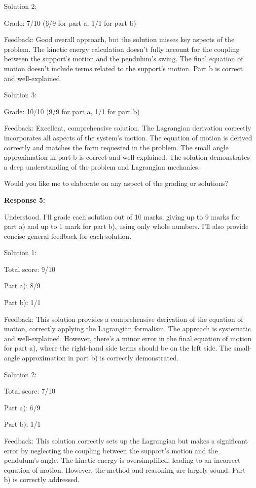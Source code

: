 \documentclass[a4paper,11pt]{article}
\begin{document}
Solution 2:

Grade: 7/10 (6/9 for part a, 1/1 for part b)

Feedback: Good overall approach, but the solution misses key aspects of the problem. The kinetic energy calculation doesn't fully account for the coupling between the support's motion and the pendulum's swing. The final equation of motion doesn't include terms related to the support's motion. Part b is correct and well-explained.

Solution 3:

Grade: 10/10 (9/9 for part a, 1/1 for part b)

Feedback: Excellent, comprehensive solution. The Lagrangian derivation correctly incorporates all aspects of the system's motion. The equation of motion is derived correctly and matches the form requested in the problem. The small angle approximation in part b is correct and well-explained. The solution demonstrates a deep understanding of the problem and Lagrangian mechanics.

Would you like me to elaborate on any aspect of the grading or solutions?

\bigskip
\textbf{Response 5:}

Understood. I'll grade each solution out of 10 marks, giving up to 9 marks for part a) and up to 1 mark for part b), using only whole numbers. I'll also provide concise general feedback for each solution.

Solution 1:

Total score: 9/10

Part a): 8/9

Part b): 1/1

Feedback: This solution provides a comprehensive derivation of the equation of motion, correctly applying the Lagrangian formalism. The approach is systematic and well-explained. However, there's a minor error in the final equation of motion for part a), where the right-hand side terms should be on the left side. The small-angle approximation in part b) is correctly demonstrated.

Solution 2:

Total score: 7/10

Part a): 6/9

Part b): 1/1

Feedback: This solution correctly sets up the Lagrangian but makes a significant error by neglecting the coupling between the support's motion and the pendulum's angle. The kinetic energy is oversimplified, leading to an incorrect equation of motion. However, the method and reasoning are largely sound. Part b) is correctly addressed.
\end{document}
